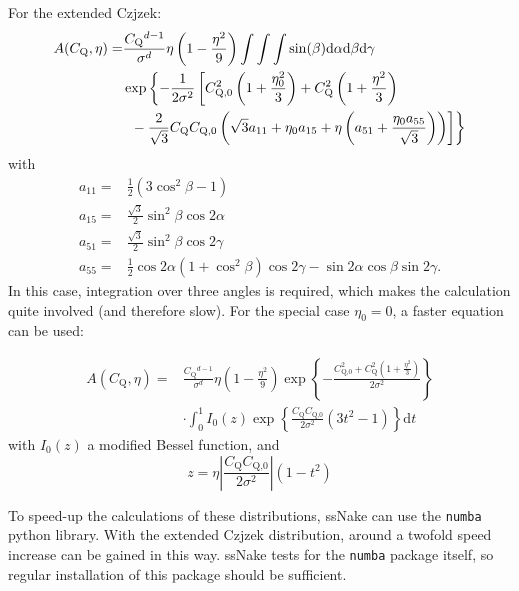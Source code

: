 \documentclass[11pt,a4paper]{article}
\begin{document}
For the extended Czjzek:
\begin{align}
  A(C_\text{Q},\eta) = & \frac{C_\text{Q}{}^{d-1}}{\sigma^d} \eta \left(1 - \frac{\eta^2}{9} \right)
  \int \int \int \sin(\beta) \text{d}\alpha \text{d}\beta \text{d}\gamma \nonumber \\
  & \exp \left\{ -\frac{1}{2\sigma^2} \left[ C_\text{Q,0}^2 \left(1 + \frac{\eta_0^2}{3}\right) +
  C_\text{Q}^2 \left(1+ \frac{\eta^2}{3}\right) \right.\right. \\
  & \left.\vphantom{\frac{a^1}{1}} \left.\vphantom{\frac{a^1}{1}} - \frac{2}{\sqrt{3}} C_\text{Q} C_\text{Q,0} \left( \sqrt{3} a_{11} + \eta_0 a_{15} + \eta \left(
 a_{51} + \frac{\eta_0 a_{55}}{\sqrt{3}} \right) \right) \right] \right\} \nonumber
\end{align}
with
\begin{align}
  a_{11} = & \frac{1}{2} (3\cos^2\beta - 1)\\
  a_{15} = & \frac{\sqrt{3}}{2} \sin^2\beta \cos 2\alpha \\
  a_{51} = & \frac{\sqrt{3}}{2} \sin^2\beta \cos 2\gamma \\
  a_{55} = & \frac{1}{2} \cos 2\alpha (1 + \cos^2\beta) \cos2\gamma - \sin 2 \alpha \cos \beta \sin
  2 \gamma.
\end{align}
In this case, integration over three angles is required, which makes the calculation quite involved
(and therefore slow). For the special case $\eta_0=0$, a faster equation can be used:

\begin{align}
  A(C_\text{Q},\eta) = & \frac{C_\text{Q}{}^{d-1}}{\sigma^d} \eta \left(1 - \frac{\eta^2}{9} \right)
  \exp \left\{ - \frac{C_\text{Q,0}^2 + C_\text{Q}^2 (1 + \frac{\eta^2}{3})}{2\sigma^2} \right\}\\
  & \cdot \int_0^1 I_0(z) \exp \left\{ \frac{C_\text{Q}C_\text{Q,0}}{2\sigma^2} (3t^2 - 1)   \right\} \text{d}t
\end{align}
with $I_0(z)$ a modified Bessel function, and
\begin{equation}
  z = \eta \left| \frac{C_\text{Q}C_\text{Q,0}}{2\sigma^2}\right| (1 - t^2)
\end{equation}

To speed-up the calculations of these distributions, ssNake can use the \texttt{numba} python library. With
the extended Czjzek distribution, around a twofold speed increase can be gained in this way. ssNake
tests for the \texttt{numba} package itself, so regular installation of this package should be sufficient.
\end{document}
